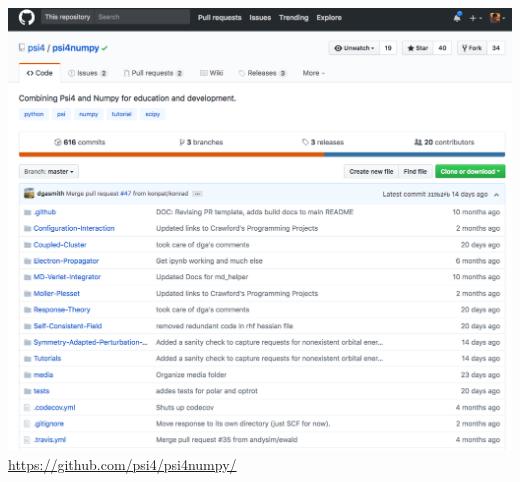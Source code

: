 \documentclass[xcolor=usenames,dvipsnames,svgnames]{beamer}
\begin{document}
\begin{frame}
  \centering
  \includegraphics[scale=0.20]{./figures/psi4numpy_github.png}
  {\scriptsize \url{https://github.com/psi4/psi4numpy/}}
\end{frame}

\end{document}
